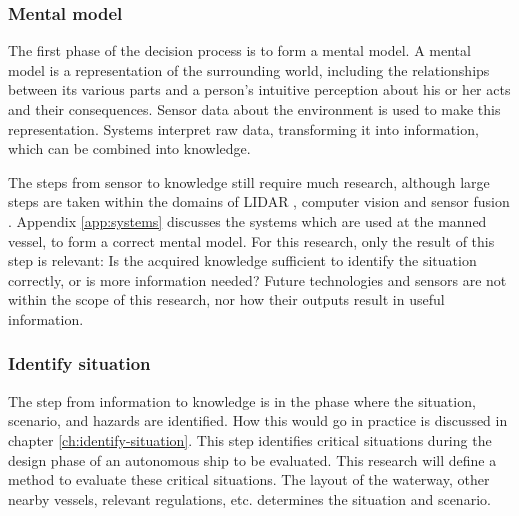 \subsubsection{Mental model}
The first phase of the decision process is to form a mental model. A mental model is a representation of the surrounding world, including the relationships between its various parts and a person's intuitive perception about his or her acts and their consequences.
Sensor data about the environment is used to make this representation. Systems interpret raw data, transforming it into information, which can be combined into knowledge. 

The steps from sensor to knowledge still require much research, although large steps are taken within the domains of LIDAR \cite{Cameron2017}, computer vision \cite{Marr2017} and sensor fusion \cite{Hoffman2018}. Appendix \ref{app:systems} discusses the systems which are used at the manned vessel, to form a correct mental model. For this research, only the result of this step is relevant: Is the acquired knowledge sufficient to identify the situation correctly, or is more information needed?
Future technologies and sensors are not within the scope of this research, nor how their outputs result in useful information. 

\subsubsection{Identify situation}
The step from information to knowledge is in the phase where the situation, scenario, and hazards are identified. How this would go in practice is discussed in chapter \ref{ch:identify-situation}. This step identifies critical situations during the design phase of an autonomous ship to be evaluated. 
This research will define a method to evaluate these critical situations. The layout of the waterway, other nearby vessels, relevant regulations, etc. determines the situation and scenario.

